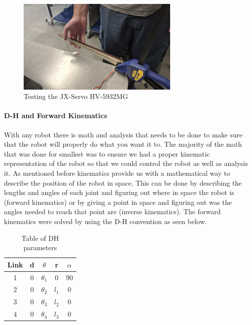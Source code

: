                 \begin{figure}[H]
                    \centering
                    \includegraphics[width=0.7\textwidth]{figures/TestingMotors.png}
                    \caption{Testing the JX-Servo HV-5932MG}
                    \label{fig:MotorTesting}
                \end{figure}        


        \paragraph{D-H and Forward Kinematics}
            With any robot there is math and analysis that needs to be done to make sure that the robot will properly do what you want it to. The majority of the math that was done for smallest was to ensure we had a proper kinematic representation of the robot so that we could control the robot as well as analysis it. As mentioned before kinematics provide us with a mathematical way to describe the position of the robot in space. This can be done by describing the lengths and angles of each joint and figuring out where in space the robot is (forward kinematics) or by giving a point in space and figuring out was the angles needed to reach that point are (inverse kinematics). The forward kinematics were solved by using the D-H convention as seen below.
        
            \begin{table}[H]
                \centering
                \begin{tabular}{|c|c|c|c|c|}
                \hline
                    Link & d & $\theta$ & r & $\alpha$\\
                    \hline
                    1 & 0 & $\theta_1$ & 0 & 90 \\
                    2 & 0 &$\theta_2$ & $l_1$ & 0  \\
                    3 & 0 &$\theta_3$ & $l_2$ & 0 \\
                    4 & 0 &$\theta_4$ & $l_3$ & 0  \\
                    \hline
                    \end{tabular}
                \caption{Table of DH parameters}
                \label{tab:DHTable}
            \end{table}
            
